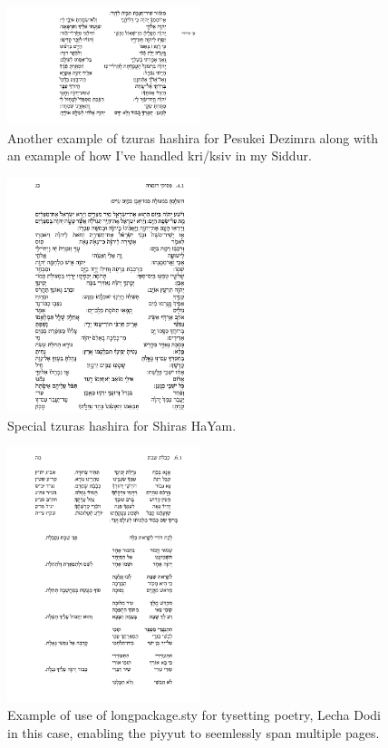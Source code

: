 \documentclass[12pt]{article}
\begin{document}
	\begin{figure}[h!]
		\centering
		\includegraphics[width=0.5\textwidth]{tehillim_30}
		\caption{Another example of tzuras hashira for Pesukei Dezimra along with an example of how I've handled kri/ksiv in my Siddur.}
	\end{figure}
	\begin{figure}[h!]
		\centering
		\includegraphics[width=0.5\textwidth]{shiras_hayam}
		\caption{Special tzuras hashira for Shiras HaYam.}
	\end{figure}
	\begin{figure}[h!]
		\centering
		\includegraphics[width=0.5\textwidth]{lecha_dodi}
		\caption{Example of use of longpackage.sty for tysetting poetry, Lecha Dodi in this case, enabling the piyyut to seemlessly span multiple pages.}
	\end{figure}
\end{document}
